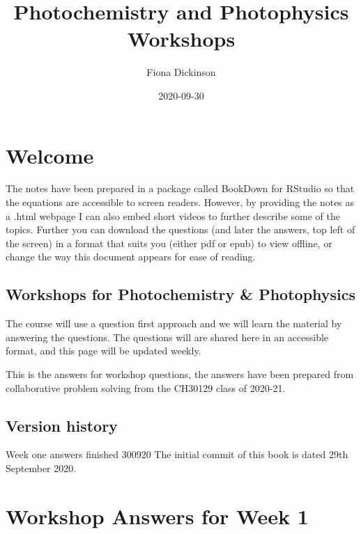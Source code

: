 \documentclass[
]{book}
\title{Photochemistry and Photophysics Workshops}
\author{Fiona Dickinson}
\date{2020-09-30}
\begin{document}
\maketitle

{
\setcounter{tocdepth}{1}
\tableofcontents
}
\hypertarget{welcome}{%
\chapter*{Welcome}\label{welcome}}

The notes have been prepared in a package called BookDown for RStudio so that the equations are accessible to screen readers. However, by providing the notes as a .html webpage I can also embed short videos to further describe some of the topics. Further you can download the questions (and later the answers, top left of the screen) in a format that suits you (either pdf or epub) to view offline, or change the way this document appears for ease of reading.

\hypertarget{workshops-for-photochemistry-photophysics}{%
\section*{Workshops for Photochemistry \& Photophysics}\label{workshops-for-photochemistry-photophysics}}

The course will use a question first approach and we will learn the material by answering the questions. The questions will are shared here in an accessible format, and this page will be updated weekly.

This is the answers for workshop questions, the answers have been prepared from collaborative problem solving from the CH30129 class of 2020-21.

\hypertarget{version-history}{%
\section*{Version history}\label{version-history}}

Week one answers finished 300920
The initial commit of this book is dated 29th September 2020.

\hypertarget{ch:Workshop1}{%
\chapter{Workshop Answers for Week 1}\label{ch:Workshop1}}
\end{document}
